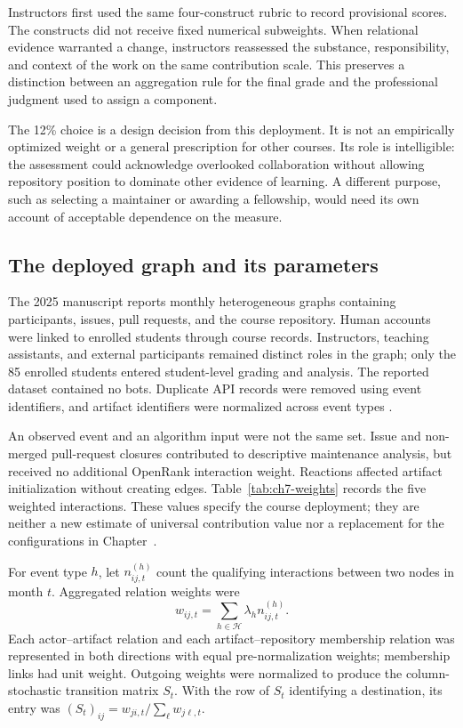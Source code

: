 Instructors first used the same four-construct rubric to record provisional scores. The constructs did not receive fixed numerical subweights. When relational evidence warranted a change, instructors reassessed the substance, responsibility, and context of the work on the same contribution scale. This preserves a distinction between an aggregation rule for the final grade and the professional judgment used to assign a component.

The 12\% choice is a design decision from this deployment. It is not an empirically optimized weight or a general prescription for other courses. Its role is intelligible: the assessment could acknowledge overlooked collaboration without allowing repository position to dominate other evidence of learning. A different purpose, such as selecting a maintainer or awarding a fellowship, would need its own account of acceptable dependence on the measure.

\subsection{The deployed graph and its parameters}
The 2025 manuscript reports monthly heterogeneous graphs containing participants, issues, pull requests, and the course repository. Human accounts were linked to enrolled students through course records. Instructors, teaching assistants, and external participants remained distinct roles in the graph; only the 85 enrolled students entered student-level grading and analysis. The reported dataset contained no bots. Duplicate API records were removed using event identifiers, and artifact identifiers were normalized across event types \citep[Section IV]{seetmanuscript}.

An observed event and an algorithm input were not the same set. Issue and non-merged pull-request closures contributed to descriptive maintenance analysis, but received no additional OpenRank interaction weight. Reactions affected artifact initialization without creating edges. Table~\ref{tab:ch7-weights} records the five weighted interactions. These values specify the course deployment; they are neither a new estimate of universal contribution value nor a replacement for the configurations in Chapter~.



For event type \(h\), let \(n^{(h)}_{ij,t}\) count the qualifying interactions between two nodes in month \(t\). Aggregated relation weights were
\begin{equation}
w_{ij,t}=\sum_{h\in\mathcal H}\lambda_h n^{(h)}_{ij,t}.
\label{eq:ch7-weights}
\end{equation}
Each actor--artifact relation and each artifact--repository membership relation was represented in both directions with equal pre-normalization weights; membership links had unit weight. Outgoing weights were normalized to produce the column-stochastic transition matrix \(S_t\). With the row of \(S_t\) identifying a destination, its entry was \((S_t)_{ij}=w_{ji,t}/\sum_\ell w_{j\ell,t}\).

